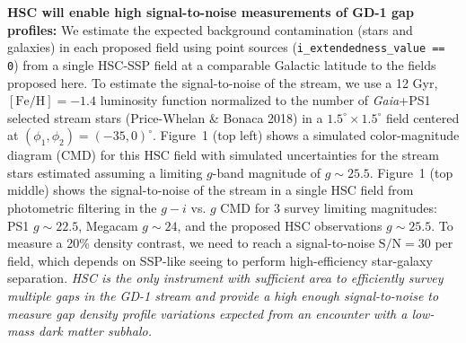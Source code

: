 \documentclass[11pt]{article}
\begin{document}
\textbf{HSC will enable high signal-to-noise measurements of GD-1 gap profiles:}
We estimate the expected background contamination (stars and galaxies) in each proposed field using point sources (\texttt{i\_extendedness\_value == 0}) from a single HSC-SSP field at a comparable Galactic latitude to the fields proposed here.
To estimate the signal-to-noise of the stream, we use a 12 Gyr, $[\textrm{Fe}/\textrm{H}] = -1.4$ luminosity function normalized to the number of \textit{Gaia}+PS1 selected stream stars (Price-Whelan \& Bonaca 2018) in a $1.5^\circ \times 1.5^\circ$ field centered at $(\phi_1, \phi_2) = (-35, 0)^\circ$.
Figure~1 (top left) shows a simulated color-magnitude diagram (CMD) for this HSC field with simulated uncertainties for the stream stars estimated assuming a limiting $g$-band magnitude of $g \sim 25.5$.
Figure~1 (top middle) shows the signal-to-noise of the stream in a single HSC field from photometric filtering in the $g-i$ vs. $g$ CMD for 3 survey limiting magnitudes: PS1 $g \sim 22.5$, Megacam $g \sim 24$, and the proposed HSC observations $g \sim 25.5$.
To measure a 20\% density contrast, we need to reach a signal-to-noise $\textrm{S}/\textrm{N} = 30$ per field, which depends on SSP-like seeing to perform high-efficiency star-galaxy separation.
\emph{HSC is the only instrument with sufficient area to efficiently survey multiple gaps in the GD-1 stream and provide a high enough signal-to-noise to measure gap density profile variations expected from an encounter with a low-mass dark matter subhalo.}

\end{document}
